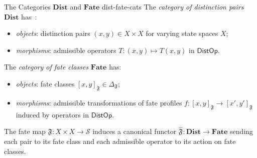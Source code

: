 \documentclass[12pt,twoside,openright]{book}
\newcommand{\fateClasses}{\Delta_{\mathfrak{F}}}
\newcommand{\fateMap}{\mathfrak{F}}
\newcommand{\fateSpace}{\mathcal{S}}
\newcommand{\distOp}{\mathsf{DistOp}}
\newcommand{\fateClass}[1]{[#1]_{\mathfrak{F}}}
\newcommand{\catDist}{\mathbf{Dist}}
\newcommand{\catFate}{\mathbf{Fate}}
\providecommand{\fateClasses}{\Delta_{\mathfrak{F}}}
\providecommand{\fateClass}[1]{[#1]_{\mathfrak{F}}}
\providecommand{\catDist}{\mathbf{Dist}}
\providecommand{\catFate}{\mathbf{Fate}}
\begin{document}
\begin{definition}{The Categories \texorpdfstring{$\catDist$}%
  {Dist} and \texorpdfstring{$\catFate$}{Fate}}%
  {dist-fate-cats}
The \emph{category of distinction pairs} $\catDist$ has~\cite{maclane1998}:
\begin{itemize}[nosep,leftmargin=2em]
  \item \emph{objects}: distinction pairs $(x,y)\in X\times X$
    for varying state spaces $X$;
  \item \emph{morphisms}: admissible operators
    $T:(x,y)\mapsto T(x,y)$ in $\distOp$.
\end{itemize}
The \emph{category of fate classes} $\catFate$ has:
\begin{itemize}[nosep,leftmargin=2em]
  \item \emph{objects}: fate classes $\fateClass{x,y}
    \in\fateClasses$;
  \item \emph{morphisms}: admissible transformations of fate
    profiles $f:\fateClass{x,y}\to\fateClass{x',y'}$ induced
    by operators in $\distOp$.
\end{itemize}
The fate map $\fateMap:X\times X\to\fateSpace$ induces a
canonical functor $\hat{\fateMap}:\catDist\to\catFate$ sending
each pair to its fate class and each admissible operator to its
action on fate classes.
\end{definition}
\end{document}
